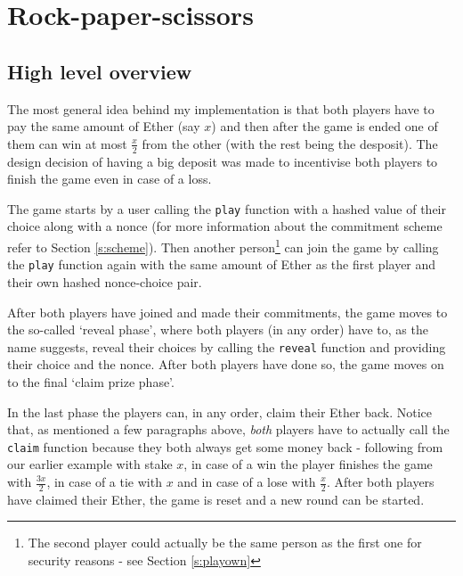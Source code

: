 \documentclass{article}
\begin{document}
    \section{Rock-paper-scissors}

    \subsection{High level overview} \label{s:overview}
    The most general idea behind my implementation is that
    both players have to pay the same amount of Ether (say
    \(x\)) and then after the game is ended one of them can
    win at most \(\frac{x}{2}\) from the other (with the
    rest being the desposit). The design decision of having
    a big deposit was made to incentivise both players to
    finish the game even in case of a loss.
    \newline

    \noindent The game starts by a user calling the
    \verb|play| function with a hashed value of their choice
    along with a nonce (for more information about the
    commitment scheme refer to Section \ref{s:scheme}). Then
    another person\footnote{The second player could actually
    be the same person as the first one for security reasons
    - see Section \ref{s:playown}} can join the game by
    calling the \verb|play| function again with the same
    amount of Ether as the first player and their own hashed
    nonce-choice pair.
    \newline

    \noindent After both players have joined and made their
    commitments, the game moves to the so-called `reveal
    phase', where both players (in any order) have to, as
    the name suggests, reveal their choices by calling the
    \verb|reveal| function and providing their choice and
    the nonce. After both players have done so, the game
    moves on to the final `claim prize phase'.
    \newline

    \noindent In the last phase the players can, in any
    order, claim their Ether back. Notice that, as mentioned
    a few paragraphs above, {\itshape both} players have to
    actually call the \verb|claim| function because they
    both always get some money back - following from our
    earlier example with stake \(x\), in case of a win the
    player finishes the game with \(\frac{3x}{2}\), in case
    of a tie with \(x\) and in case of a lose with
    \(\frac{x}{2}\). After both players have claimed their
    Ether, the game is reset and a new round can be started.
\end{document}
